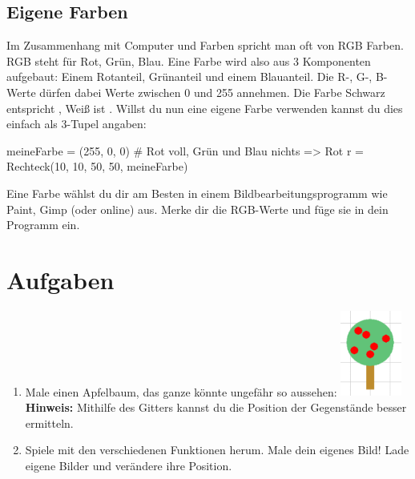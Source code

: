 \documentclass{\VorlagenPfad/coderdojokatext}
\begin{document}
\subsection{Eigene Farben}
Im Zusammenhang mit Computer und Farben spricht man oft von RGB Farben. RGB steht für Rot, Grün, Blau. Eine Farbe wird also aus 3 Komponenten aufgebaut: Einem Rotanteil, Grünanteil und einem Blauanteil. Die R-, G-, B-Werte dürfen dabei Werte zwischen 0 und 255 annehmen. Die Farbe Schwarz entspricht , Weiß ist . 
Willst du nun eine eigene Farbe verwenden kannst du dies einfach als 3-Tupel angaben:

\begin{pythoncode}
meineFarbe = (255, 0, 0) # Rot voll, Grün und Blau nichts => Rot
r = Rechteck(10, 10, 50, 50, meineFarbe)
\end{pythoncode}
Eine Farbe wählst du dir am Besten in einem Bildbearbeitungsprogramm wie Paint, Gimp (oder online) aus. Merke dir die RGB-Werte und füge sie in dein Programm ein.

\section{Aufgaben}
\begin{enumerate}
\item Male einen Apfelbaum, das ganze könnte ungefähr so aussehen:
\includegraphics[width=20mm]{baum.png}	
\\
\textbf{Hinweis:} Mithilfe des Gitters kannst du die Position der Gegenstände besser ermitteln.

\item Spiele mit den verschiedenen Funktionen herum. Male dein eigenes Bild! Lade eigene Bilder und verändere ihre Position.
\end{enumerate}
\end{document}
